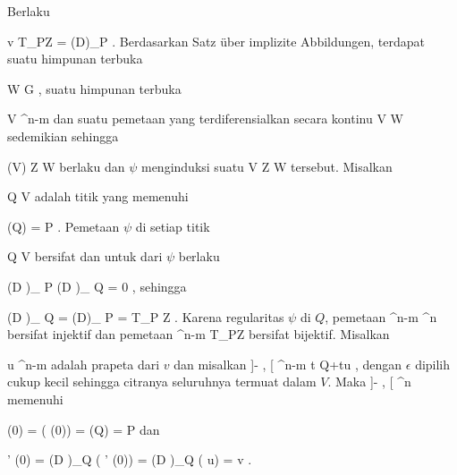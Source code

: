 {

Berlaku

\mavergleichskette
{\vergleichskette
{v
}
{ \in }{ T_PZ
}
{ = }{ \ker  \left(D\varphi\right)_{P}
}
{    }{
}
{   }{
}
}
{}{}{.}
Berdasarkan
Satz über implizite Abbildungen,
terdapat suatu himpunan terbuka

 {}
 {W \subseteq G} {}
 {} {} {} {,}
suatu himpunan terbuka

\mavergleichskette
{\vergleichskette
{ V
}
{ \subseteq }{ \R^{n-m}
}
{  }{
}
{    }{
}
{   }{
}
}
{}{}{}
dan suatu pemetaan yang terdiferensialkan secara kontinu
\maabbdisp {\psi} { V } { W
} {}
sedemikian sehingga

\mavergleichskette
{\vergleichskette
{ \psi(V)
}
{ \subseteq }{ Z \cap W
}
{  }{
}
{    }{
}
{   }{
}
}
{}{}{}
berlaku dan $\psi$ menginduksi suatu
\maabbdisp {\psi} { V } { Z \cap W
} {}
tersebut. Misalkan

\mavergleichskette
{\vergleichskette
{ Q
}
{ \in }{ V
}
{  }{
}
{    }{
}
{   }{
}
}
{}{}{}
adalah titik yang memenuhi

\mavergleichskette
{\vergleichskette
{ \psi(Q)
}
{ = }{ P
}
{  }{
}
{    }{
}
{   }{
}
}
{}{}{.}
Pemetaan $\psi$ di setiap titik

\mavergleichskette
{\vergleichskette
{ Q
}
{ \in }{ V
}
{  }{
}
{    }{
}
{   }{
}
}
{}{}{}
bersifat
dan untuk
dari $\psi$ berlaku

\mavergleichskettedisp
{\vergleichskette
{ \left(D \varphi \right)_{ P }  \circ \left(D \psi \right)_{ Q }
}
{ =} { 0
}
{ } {
}
{ } {
}
{ } {
}
}
{}{}{,}
sehingga

\mavergleichskettedisp
{\vergleichskette
{   \left(D \psi\right)_{ Q }
}
{ =} { \ker  \left(D\varphi \right)_{ P }
}
{ =} { T_P Z
}
{ } {
}
{ } {
}
}
{}{}{.}
Karena regularitas $\psi$ di $Q$, pemetaan
 { \R^{n-m}  } { \R^n
} {}
bersifat injektif dan pemetaan
 { \R^{n-m}  } { T_PZ
} {}
bersifat bijektif. Misalkan

\mavergleichskette
{\vergleichskette
{ u
}
{ \in }{ \R^{n-m}
}
{  }{
}
{    }{
}
{   }{
}
}
{}{}{}
adalah prapeta dari $v$ dan misalkan
\maabbeledisp {\theta} { ]- \epsilon, \epsilon[ } { \R^{n-m}
} { t } { Q+tu
} {,}
dengan $\epsilon$ dipilih cukup kecil sehingga citranya seluruhnya termuat dalam $V$. Maka
\maabbdisp {\gamma = \psi \circ \theta} { ]- \epsilon, \epsilon[  } { \R^n
} {}
memenuhi

\mavergleichskettedisp
{\vergleichskette
{ \gamma(0)
}
{ =} { \psi( \theta (0))
}
{ =} { \psi(Q)
}
{ =} { P
}
{ } {
}
}
{}{}{}
dan

\mavergleichskettedisp
{\vergleichskette
{ \gamma' (0)
}
{ =} { \left(D \psi\right)_{Q} ( \theta' (0))
}
{ =} { \left(D \psi\right)_{Q} ( u)
}
{ =} { v
}
{ } {
}
}
{}{}{.}

 }




